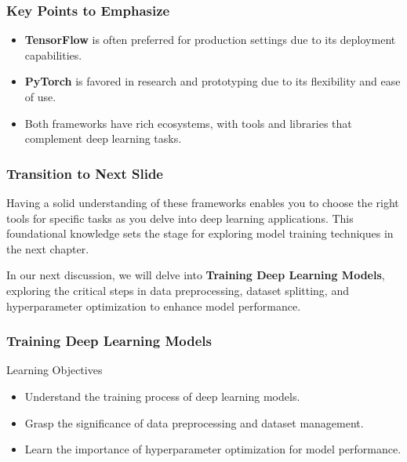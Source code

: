 \documentclass[aspectratio=169]{beamer}
\begin{document}
\begin{frame}
    \frametitle{Key Points to Emphasize}
    \begin{itemize}
        \item \textbf{TensorFlow} is often preferred for production settings due 
              to its deployment capabilities.
        \item \textbf{PyTorch} is favored in research and prototyping due to 
              its flexibility and ease of use.
        \item Both frameworks have rich ecosystems, with tools and libraries 
              that complement deep learning tasks.
    \end{itemize}
\end{frame}

\begin{frame}
    \frametitle{Transition to Next Slide}
    Having a solid understanding of these frameworks enables you to choose the 
    right tools for specific tasks as you delve into deep learning applications. 
    This foundational knowledge sets the stage for exploring model training techniques 
    in the next chapter.
    
    In our next discussion, we will delve into \textbf{Training Deep Learning Models}, 
    exploring the critical steps in data preprocessing, dataset splitting, and 
    hyperparameter optimization to enhance model performance.
\end{frame}

\begin{frame}[fragile]
    \frametitle{Training Deep Learning Models}
    \begin{block}{Learning Objectives}
        \begin{itemize}
            \item Understand the training process of deep learning models.
            \item Grasp the significance of data preprocessing and dataset management.
            \item Learn the importance of hyperparameter optimization for model performance.
        \end{itemize}
    \end{block}
\end{frame}
\end{document}
